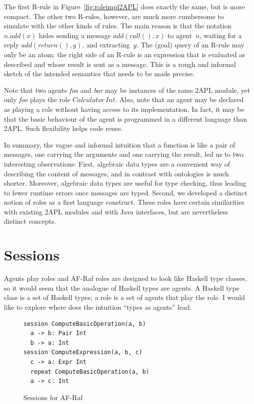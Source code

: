\documentclass[a4paper,12pt,oneside,fleqn]{book} %
\newcommand{\todo}[1]{[\textcolor{red}{TODO}: #1]}
\begin{document}
{The first R-rule in Figure~\ref{fig:roleimpl2APL} does exactly the same,
but is more compact. The other two R-rules, however, are much more
cumbersome to simulate with the other kinds of rules. The main reason is
that the notation $n.\mathit{add}(x)$ hides sending a message
$\mathit{add}(\mathit{call}(),x)$ to agent~$n$, waiting for a reply
$\mathit{add}(\mathit{return}(),y)$, and extracting~$y$. The (goal) query
of an R-rule may only be an atom; the right side of an R-rule is an
expression that is evaluated as described and whose result is sent as a
message.  This is a rough and informal sketch of the intended semantics
that needs to be made precise.

Note that two agents \textit{foo} and \textit{bar} may be instances of the
same 2APL module, yet only \textit{foo} plays the role
$\mathit{Calculator}\,\mathit{Int}$. Also, note that an agent may be
declared as playing a role without having access to its implementation. In
fact, it may be that the basic behaviour of the agent is programmed in a
different language than 2APL. Such flexibility helps code reuse.

In summary, the vague and informal intuition that a function is like a pair
of messages, one carrying the arguments and one carrying the result, led us
to two interesting observations: First, algebraic data types are a
convenient way of describing the content of messages, and in contrast with
ontologies is much shorter. Moreover, algebraic data types are useful for
type checking, thus leading to fewer runtime errors once messages are
typed. Second, we developed a distinct notion of roles as a first language
construct. These roles have certain similarities with existing 2APL modules
and with Java interfaces, but are nevertheless distinct concepts.


\section{Sessions}\label{sec:sessions} %

Agents play roles and AF-Raf roles are designed to look like Haskell type
classes, so it would seem that the analogue of Haskell types are
agents. A Haskell type class is a set of Haskell types; a role is a
set of agents that play the role. I would like to explore where
does the intuition ``types as agents'' lead.

\begin{figure}\footnotesize %
\begin{verbatim}
session ComputeBasicOperation(a, b)
  a -> b: Pair Int
  b -> a: Int
session ComputeExpression(a, b, c)
  c -> a: Expr Int
  repeat ComputeBasicOperation(a, b)
  a -> c: Int
\end{verbatim}
\caption{Sessions for AF-Raf}\label{fig:sessions}
\end{figure} %

}
\end{document}
